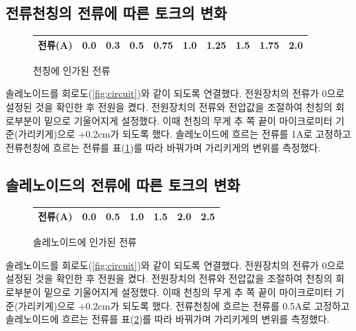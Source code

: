 \documentclass[a4paper]{article}
\begin{document}
		\subsection{전류천칭의 전류에 따른 토크의 변화}

		\begin{figure}
			\centering
            \vspace{-0.5 cm}
			\begin{tabular}{cccccccccc} 
				\hline \hline
				전류(A) \vline & 0.0 & 0.3 & 0.5 & 0.75 & 1.0 & 1.25 & 1.5 & 1.75 & 2.0 \\
				\hline \hline
			\end{tabular}  \vspace{-0.2cm} \caption{천칭에 인가된 전류}
			\vspace{-0.5cm}
			\label{tb:cirinput}
		\end{figure}
		솔레노이드를 회로도(\ref{fig:circuit})와 같이 되도록 연결했다. 
		전원장치의 전류가 0으로 설정된 것을 확인한 후 전원을 켰다.
		전원장치의 전류와 전압값을 조절하여 천칭의 회로부분이 밑으로 기울어지게 설정했다.
		이때 천칭의 무게 추 쪽 끝이 마이크로미터 기준(가리키게)으로 +0.2\si{cm}가 되도록 했다.
		솔레노이드에 흐르는 전류를 1\si{A}로 고정하고 전류천칭에 흐르는 전류를 표(\ref{tb:cirinput})를 따라 바꿔가며 가리키게의 변위를 측정했다.

		\subsection{솔레노이드의 전류에 따른 토크의 변화}

		\begin{figure}
			\centering
            \vspace{-0.5 cm}
			\begin{tabular}{ccccccc} 
				\hline \hline
				전류(A) \vline & 0.0 & 0.5 & 1.0 & 1.5 & 2.0 & 2.5 \\
				\hline \hline
			\end{tabular}  \vspace{-0.2cm} \caption{솔레노이드에 인가된 전류}
			\vspace{-0.5cm}
			\label{tb:solinput}
		\end{figure}
		솔레노이드를 회로도(\ref{fig:circuit})와 같이 되도록 연결했다. 
		전원장치의 전류가 0으로 설정된 것을 확인한 후 전원을 켰다.
		전원장치의 전류와 전압값을 조절하여 천칭의 회로부분이 밑으로 기울어지게 설정했다.
		이때 천칭의 무게 추 쪽 끝이 마이크로미터 기준(가리키게)으로 +0.2\si{cm}가 되도록 했다.
		전류천칭에 흐르는 전류를 0.5\si{A}로 고정하고 솔레노이드에 흐르는 전류를 표(\ref{tb:solinput})를 따라 바꿔가며 가리키게의 변위를 측정했다.
	
\end{document}

